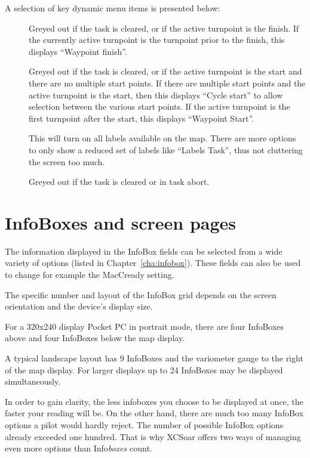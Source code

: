 A selection of key dynamic menu items is presented below:
\begin{description}
\item[]
  Greyed out if the task is cleared, or if the active turnpoint is the
  finish. If the currently active turnpoint is the turnpoint prior to the
  finish, this displays  ``Waypoint finish''.
\item[]
  Greyed out if the task is cleared, or if the active turnpoint is the
  start and there are no multiple start points.  If there are multiple
  start points and the active turnpoint is the start, then this
  displays ``Cycle start'' to allow selection between the various
  start points.  If the active turnpoint is the first turnpoint after
  the start, this displays ``Waypoint Start''.
\item[]
  This will turn on all labels available on the map. There are more options to
  only show a reduced set of labels like ``Labels Task'', thus not cluttering the
  screen too much.
\item[]
  Greyed out if the task is cleared or in task abort.
\end{description}


\section{InfoBoxes and screen pages}\label{sec:infoboxandpages}

The information displayed in the InfoBox fields can be selected from a
wide variety of options (listed in Chapter~\ref{cha:infobox}). These
fields can also be used to change for example the MacCready setting.

The specific number and layout of the InfoBox grid depends on the
screen orientation and the device's display size.

For a 320x240 display
Pocket PC in portrait mode, there are four InfoBoxes above and four
InfoBoxes below the map display.

A typical landscape layout has 9 InfoBoxes and the variometer gauge
to the right of the map display.
For larger displays up to 24 InfoBoxes may be displayed simultaneously.

In order to gain clarity, the less infoboxes you choose to be displayed at once,
the faster your reading will be. On the other hand, there are much too many
InfoBox options a pilot would hardly reject. The number of possible InfoBox
options already exceeded one hundred. That is why XCSoar offers two ways of
managing even more options than Info\emph{boxes} count.

